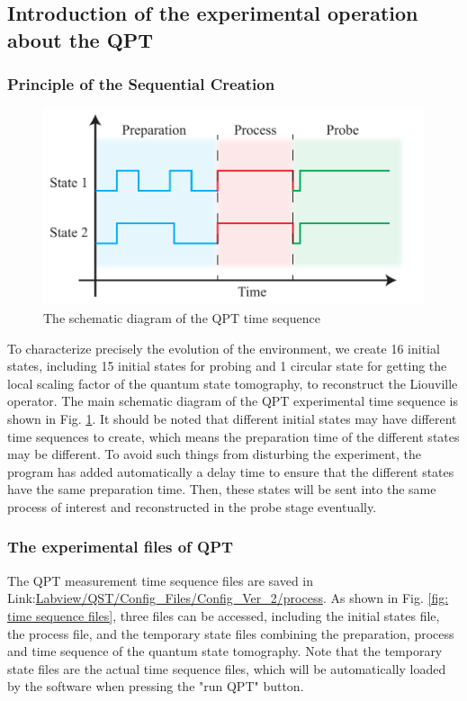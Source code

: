 \documentclass{article}
\begin{document}
\subsection{Introduction of the experimental operation about the QPT}
\subsubsection{Principle of the Sequential Creation}
\begin{figure}[htbp]
    \centering
    \includegraphics[width=0.9\linewidth]{fig/TimeSeq.pdf}
    \caption{The schematic diagram of the QPT time sequence}
    \label{fig: QPT time seq}
\end{figure}
To characterize precisely the evolution of the environment, we create 16 initial states, including 15 initial states for probing and 1 circular state for getting the local scaling factor of the quantum state tomography, to reconstruct the Liouville operator. The main schematic diagram of the QPT experimental time sequence is shown in Fig. \ref{fig: QPT time seq}. It should be noted that different initial states may have different time sequences to create, which means the preparation time of the different states may be different. To avoid such things from disturbing the experiment, the program has added automatically a delay time to ensure that the different states have the same preparation time. Then, these states will be sent into the same process of interest and reconstructed in the probe stage eventually. 

\subsubsection{The experimental files of QPT}
The QPT measurement time sequence files are saved in Link:\url{Labview/QST/Config_Files/Config_Ver_2/process}. As shown in Fig. \ref{fig: time sequence files}, three files can be accessed, including the initial states file, the process file, and the temporary state files combining the preparation, process and time sequence of the quantum state tomography. Note that the temporary state files are the actual time sequence files, which will be automatically loaded by the software when pressing the "run QPT" button.      
\end{document}
